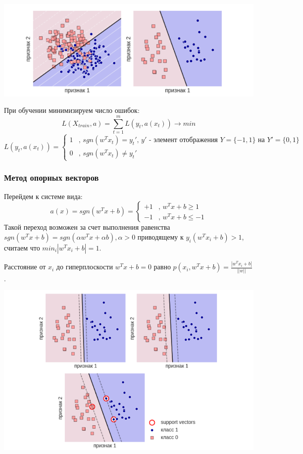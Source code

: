 \includegraphics[scale=0.4]{pics/ml2_lin3.png}

При обучении минимизируем число ошибок:
\begin{equation}
L(X_{train}, a) = \sum\limits_{t=1}^m L(y_t, a(x_t)) \rightarrow min
\end{equation}
\begin{equation*}
L(y_t, a(x_t)) =
 \begin{cases}
   1 &\text{, $sgn(w^Tx_t) = y_t'$, $y'$ - элемент отображения $Y = \{-1, 1\}$ на $Y' = \{0, 1\}$}\\
   0 &\text{, $sgn(w^Tx_t) \ne y_t'$}
 \end{cases}
\end{equation*}

\subsubsection{Метод опорных векторов}
Перейдем к системе вида:
\begin{equation*}
a(x) = sgn(w^Tx + b) =
 \begin{cases}
   +1 &\text{, $w^Tx + b \geq 1$}\\
   -1 &\text{, $w^Tx + b \leq -1$}
 \end{cases}
\end{equation*}
Такой переход возможен за счет выполнения равенства $sgn(w^Tx + b) = sgn(\alpha w^Tx + \alpha b), \alpha > 0$ приводящему к $y_i(w^Tx_i + b) > 1$, считаем что $min_i|w^Tx_i + b| = 1$.

Расстояние от $x_i$ до гиперплоскости $w^Tx + b = 0$ равно $p(x_i, w^Tx + b) = \frac{|w^Tx_i + b|}{||w||}$.

\includegraphics[scale=0.4]{pics/ml2_lin4.png}

